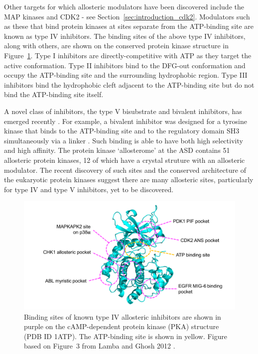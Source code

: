 Other targets for which allosteric modulators have been discovered include the MAP kinases \cite{Comess2011} and CDK2 \cite{Betzi2011} - see Section~\ref{sec:introduction_cdk2}.
Modulators such as these that bind protein kinases at sites separate from the ATP-binding site are known as type IV inhibitors.
The binding sites of the above type IV inhibitors, along with others, are shown on the conserved protein kinase structure in Figure~\ref{fig:kinase_mods}.
Type I inhibitors are directly-competitive with ATP as they target the active conformation.
Type II inhibitors bind to the DFG-out conformation and occupy the ATP-binding site and the surrounding hydrophobic region.
Type III inhibitors bind the hydrophobic cleft adjacent to the ATP-binding site but do not bind the ATP-binding site itself.

A novel class of inhibitors, the type V bisubstrate and bivalent inhibitors, has emerged recently \cite{Lamba2012}.
For example, a bivalent inhibitor was designed for a tyrosine kinase that binds to the ATP-binding site and to the regulatory domain SH3 simultaneously via a linker \cite{Hill2009}.
Such binding is able to have both high selectivity and high affinity.
The protein kinase `allosterome' at the ASD contains 51 allosteric protein kinases, 12 of which have a crystal struture with an allosteric modulator.
The recent discovery of such sites and the conserved architecture of the eukaryotic protein kinases suggest there are many allosteric sites, particularly for type IV and type V inhibitors, yet to be discovered.


\begin{figure}
\centering

\includegraphics[width=\textwidth]{figures/kinase_mods/kinase_mods}

\caption[Binding sites of known type IV allosteric inhibitors of protein kinases]
{Binding sites of known type IV allosteric inhibitors are shown in purple on the cAMP-dependent protein kinase (PKA) structure (PDB ID 1ATP).
The ATP-binding site is shown in yellow.
Figure based on Figure~3 from Lamba and Ghosh 2012 \cite{Lamba2012}.}

\label{fig:kinase_mods}
\end{figure}


